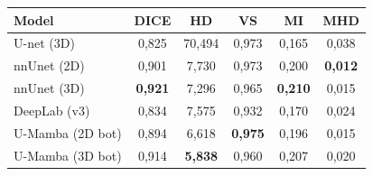 \begin{tabular}{l c c c c c}
 \hline
Model & DICE & HD & VS & MI & MHD \\ \hline
U-net (3D) & 0,825 & 70,494 & 0,973 & 0,165 & 0,038 \\ 
nnUnet (2D) & 0,901 & 7,730 & 0,973 & 0,200 & \textbf{0,012} \\ 
nnUnet (3D) & \textbf{0,921} & 7,296 & 0,965 & \textbf{0,210} & 0,015 \\ 
DeepLab (v3) & 0,834 & 7,575 & 0,932 & 0,170 & 0,024 \\ 
U-Mamba (2D bot) & 0,894 & 6,618 & \textbf{0,975} & 0,196 & 0,015 \\ 
U-Mamba (3D bot) & 0,914 & \textbf{5,838} & 0,960 & 0,207 & 0,020 \\ 
\hline 
 \end{tabular}
